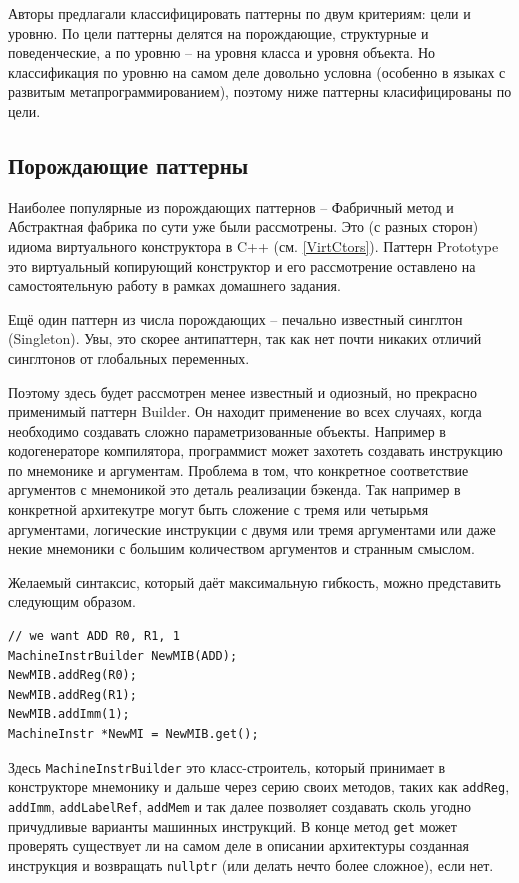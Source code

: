 \documentclass[a4paper,12pt,oneside]{book}
\begin{document}
Авторы предлагали классифицировать паттерны по двум критериям: цели и уровню. По цели паттерны делятся на порождающие, структурные и поведенческие, а по уровню -- на уровня класса и уровня объекта. Но классификация по уровню на самом деле довольно условна (особенно в языках с развитым метапрограммированием), поэтому ниже паттерны класифицированы по цели.

\subsection{Порождающие паттерны}

Наиболее популярные из порождающих паттернов -- Фабричный метод и Абстрактная фабрика по сути уже были рассмотрены. Это (с разных сторон) идиома виртуального конструктора в C++ (см. \ref{VirtCtors}). Паттерн Prototype это виртуальный копирующий конструктор и его рассмотрение оставлено на самостоятельную работу в рамках домашнего задания.

Ещё один паттерн из числа порождающих -- печально известный синглтон (Singleton). Увы, это скорее антипаттерн, так как нет почти никаких отличий синглтонов от глобальных переменных.

Поэтому здесь будет рассмотрен менее известный и одиозный, но прекрасно применимый паттерн Builder. Он находит применение во всех случаях, когда необходимо создавать сложно параметризованные объекты. Например в кодогенераторе компилятора, программист может захотеть создавать инструкцию по мнемонике и аргументам. Проблема в том, что конкретное соответствие аргументов с мнемоникой это деталь реализации бэкенда. Так например в конкретной архитекутре могут быть сложение с тремя или четырьмя аргументами, логические инструкции с двумя или тремя аргументами или даже некие мнемоники с большим количеством аргументов и странным смыслом.

Желаемый синтаксис, который даёт максимальную гибкость, можно представить следующим образом.

\begin{lstlisting}
// we want ADD R0, R1, 1
MachineInstrBuilder NewMIB(ADD);
NewMIB.addReg(R0);
NewMIB.addReg(R1);
NewMIB.addImm(1);
MachineInstr *NewMI = NewMIB.get();
\end{lstlisting}

Здесь \lstinline!MachineInstrBuilder! это класс-строитель, который принимает в конструкторе мнемонику и дальше через серию своих методов, таких как \lstinline!addReg!, \lstinline!addImm!, \lstinline!addLabelRef!, \lstinline!addMem! и так далее позволяет создавать сколь угодно причудливые варианты машинных инструкций. В конце метод \lstinline!get! может проверять существует ли на самом деле в описании архитектуры созданная инструкция и возвращать \lstinline!nullptr! (или делать нечто более сложное), если нет.
\end{document}

